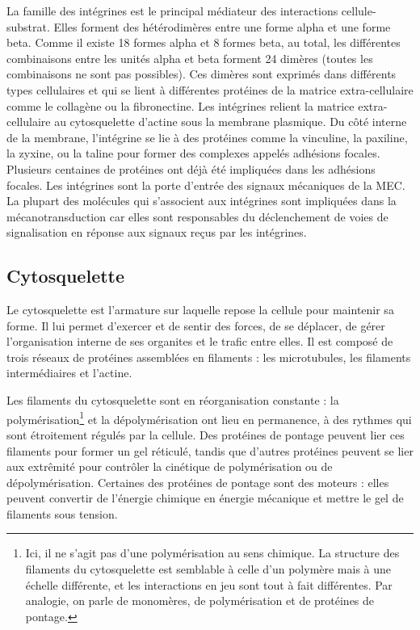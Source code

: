 La famille des intégrines est le principal médiateur des interactions cellule-substrat. Elles forment des hétérodimères entre une forme alpha et une forme beta. Comme il existe 18 formes alpha et 8 formes beta, au total, les différentes combinaisons entre les unités alpha et beta forment 24 dimères (toutes les combinaisons ne sont pas possibles).  Ces dimères sont exprimés dans différents types cellulaires et qui se lient à différentes protéines de la matrice extra-cellulaire comme le collagène ou la fibronectine. 
Les intégrines relient la matrice extra-cellulaire au cytosquelette d'actine sous la membrane plasmique. Du côté interne de la membrane, l'intégrine se lie à des protéines comme la vinculine, la paxiline, la zyxine, ou la taline pour former des complexes appelés adhésions focales. Plusieurs centaines de protéines ont déjà été impliquées dans les adhésions focales. 
Les intégrines sont la porte d'entrée des signaux mécaniques de la MEC. La plupart des molécules qui s'associent aux intégrines sont impliquées dans la mécanotransduction car elles sont responsables du déclenchement de voies de signalisation en réponse aux signaux reçus par les intégrines. 

\subsection{Cytosquelette}

Le cytosquelette est l'armature sur laquelle repose la cellule pour maintenir sa forme. Il lui permet d'exercer et de sentir des forces, de se déplacer, de gérer l'organisation interne de ses organites et le trafic entre elles. Il est composé de trois réseaux de protéines assemblées en filaments : les microtubules, les filaments intermédiaires et l'actine. 

Les filaments du cytosquelette sont en réorganisation constante : la polymérisation\footnote{Ici, il ne s'agit pas d'une polymérisation au sens chimique. La structure des filaments du cytosquelette est semblable à celle d'un polymère mais à une échelle différente, et les interactions en jeu sont tout à fait différentes. Par analogie, on parle de monomères, de polymérisation et de protéines de pontage.} et la dépolymérisation ont lieu en permanence, à des rythmes qui sont étroitement régulés par la cellule. 
Des protéines de pontage peuvent lier ces filaments pour former un gel réticulé, tandis que d'autres protéines peuvent se lier aux extrêmité pour contrôler la cinétique de polymérisation ou de dépolymérisation. Certaines des protéines de pontage sont des moteurs : elles peuvent convertir de l'énergie chimique en énergie mécanique et mettre le gel de filaments sous tension. 

